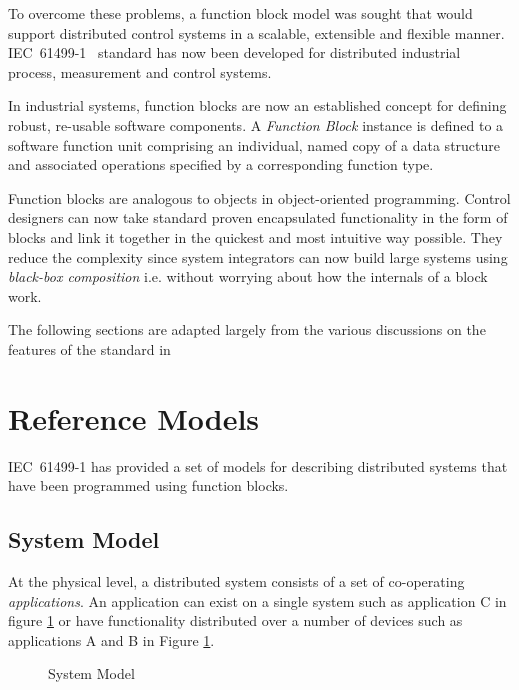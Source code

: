 To overcome these problems, a function block model was
sought that would support distributed control systems in a
scalable, extensible and flexible manner.
IEC~61499-1~\cite{iec:614991:2000} standard has now been
developed for distributed industrial process, measurement
and control systems.

In industrial systems, function blocks are now an
established concept for defining robust, re-usable software
components. A {\it Function Block} instance is defined to a
software function unit comprising an individual, named copy
of a data structure and associated operations specified by a
corresponding function type.

Function blocks are analogous to objects in object-oriented
programming. Control designers can now take standard proven
encapsulated functionality in the form of blocks and link it
together in the quickest and most intuitive way possible.
They reduce the complexity since system integrators can now
build large systems using {\it black-box composition} i.e.
without worrying about how the internals of a block work.

The following sections are adapted largely from the various
discussions on the features of the standard in
~\cite{iec:614991:2000, iec:1131:1993, l:pro:1995,
  l:mod:2001, c:des:2002, c:ope:2002}




\section{Reference Models}
IEC~61499-1 has provided a set of models for describing
distributed systems that have been programmed using function
blocks.

\subsection*{System Model} 
At the physical level, a distributed system consists of a
set of co-operating {\it applications}. An application can
exist on a single system such as application C in figure
\ref{f:System_Model} or have functionality distributed over
a number of devices such as applications A and B in Figure
\ref{f:System_Model}.

\begin{figure}
  \begin{center}
    \caption[System Model]
            {System Model{\protect ~\cite{iec:614991:2000}}}
    \label{f:System_Model}
  \end{center}
\end{figure}

